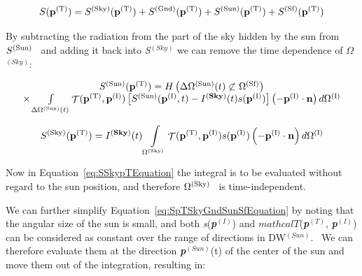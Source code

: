 \begin{equation}
S({{\bf{p}}^{{\rm{(T)}}}}) = {S^{{\rm{(Sky)}}}}({{\bf{p}}^{{\rm{(T)}}}}) + {S^{{\rm{(Gnd)}}}}({{\bf{p}}^{{\rm{(T)}}}}) + {S^{{\rm{(Sun)}}}}({{\bf{p}}^{{\rm{(T)}}}}) + {S^{{\rm{(Sf)}}}}({{\bf{p}}^{{\rm{(T)}}}})
\label{eq:SpTSkyGndSunSfEquation}
\end{equation}

By subtracting the radiation from the part of the sky hidden by the sun from \({S^{{\rm{(Sun)}}}}\) ~and adding it back into \emph{S}\(^{(Sky)}\) we can remove the time dependence of \(\Omega\)\(^{(Sky)}\):

\begin{equation}
\begin{array}{c}{S^{{\rm{(Sun)}}}}({{\bf{p}}^{{\rm{(T)}}}}) = H\left( {\Delta {\Omega ^{{\rm{(Sun)}}}}(t) \not\subset {\Omega ^{{\rm{(Sf)}}}}} \right)\\ \times \int\limits_{\Delta {\Omega ^{{\rm{(Sun)}}}}(t)} {{\mathop{\rm \mathcal{T}}\nolimits} ({{\bf{p}}^{{\rm{(T)}}}},{{\bf{p}}^{{\rm{(I)}}}})\left[ {{S^{{\rm{(Sun)}}}}({{\bf{p}}^{{\rm{(I)}}}},t) - {I^{({\bf{Sky}})}}(t)s({{\bf{p}}^{{\rm{(I)}}}})} \right]\left( { - {{\bf{p}}^{{\rm{(I)}}}}\cdot {\bf{n}}} \right)d{\Omega ^{{\rm{(I)}}}}} \end{array}
\label{eq:SSunpTEquation}
\end{equation}

\begin{equation}
{S^{{\rm{(Sky)}}}}({{\bf{p}}^{{\rm{(T)}}}}) = {I^{({\bf{Sky}})}}(t)\int\limits_{{\Omega ^{{\rm{(Sky)}}}}} {{\mathop{\rm \mathcal{T}}\nolimits} ({{\bf{p}}^{{\rm{(T)}}}},{{\bf{p}}^{{\rm{(I)}}}})s({{\bf{p}}^{{\rm{(I)}}}})\left( { - {{\bf{p}}^{{\rm{(I)}}}}\cdot {\bf{n}}} \right)d{\Omega ^{{\rm{(I)}}}}}
\label{eq:SSkypTEquation}
\end{equation}

Now in Equation~\ref{eq:SSkypTEquation} the integral is to be evaluated without regard to the sun position, and therefore \({\Omega ^{{\rm{(Sky)}}}}\) ~is time-independent.

We can further simplify Equation~\ref{eq:SpTSkyGndSunSfEquation} by noting that the angular size of the sun is small, and both \emph{s}(\textbf{\emph{p}}\(^{(I)}\)) and \(
mathcal{T}\)(\textbf{\emph{p}}\(^{(T)}\), \textbf{\emph{p}}\(^{(I)}\)) can be considered as constant over the range of directions in DW\(^{(Sun)}\).~ We can therefore evaluate them at the direction \textbf{\emph{p}}\(^{(Sun)}\)(t) of the center of the sun and move them out of the integration, resulting in:

